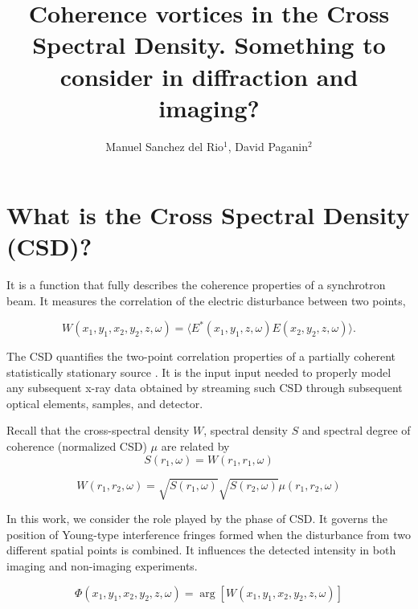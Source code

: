 \documentclass[a4paper,10pt]{article}
\title{Coherence vortices in the Cross Spectral Density. Something to consider in diffraction and imaging?}
\author{Manuel Sanchez del Rio$^1$, David Paganin$^2$}
\begin{document}
\maketitle

\begin{abstract}

\end{abstract}

\section{What is the Cross Spectral Density (CSD)?}

It is a function that fully describes the coherence properties of a synchrotron beam. It measures the correlation of the electric disturbance between two points,

\begin{equation}
W(x_1,y_1,x_2,y_2,z,\omega) = 
\langle E^{*}(x_1,y_1,z,\omega) E(x_2,y_2,z,\omega)\rangle.
\end{equation}

The CSD quantifies the two-point correlation properties of a partially coherent statistically stationary source \cite{Wolf1982,mandel_wolf}. 
It is the input input needed to properly model any subsequent x-ray data obtained by streaming such CSD through subsequent optical elements, samples, and detector.

Recall that the cross-spectral density $W$, spectral density $S$ and spectral degree of coherence (normalized CSD) $\mu$ are related by 
\begin{equation}
S(r_1,\omega) = W(r_1,r_1,\omega) 
\end{equation}

\begin{equation}
W(r_1,r_2,\omega)=\sqrt{S(r_1,\omega)}\sqrt{S(r_2,\omega)}\mu(r_1,r_2,\omega)
\end{equation}

In this work, we consider the role played by the phase of CSD. It governs the position of Young-type interference fringes formed when the disturbance from two different spatial points is combined. It influences the detected intensity in both imaging and non-imaging experiments.

\begin{equation}\label{phase_of_W}
\Phi(x_1,y_1,x_2,y_2,z,\omega)=\arg[W(x_1,y_1,x_2,y_2,z,\omega)]
\end{equation}
\end{document}
